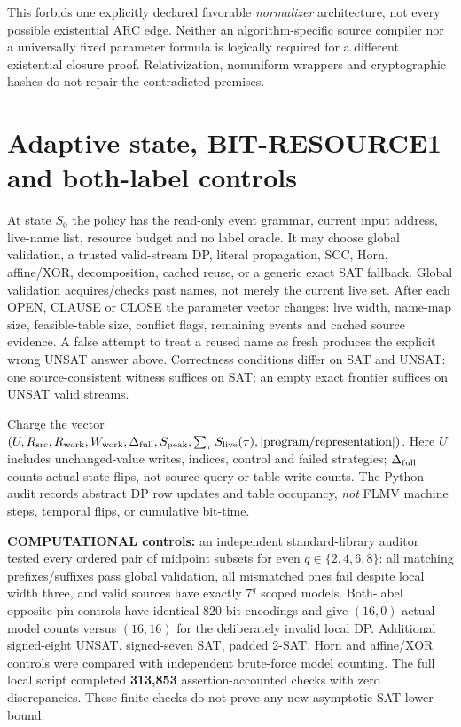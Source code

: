 \documentclass[11pt]{article}
\begin{document}
This forbids one explicitly declared favorable \emph{normalizer}
architecture, not every possible existential ARC edge. Neither an
algorithm-specific source compiler nor a universally fixed parameter
formula is logically required for a different existential closure
proof. Relativization, nonuniform wrappers and cryptographic hashes
do not repair the contradicted premises.

\section{Adaptive state, BIT-RESOURCE1 and both-label controls}
At state $S_0$ the policy has the read-only event grammar, current
input address, live-name list, resource budget and no label oracle.
It may choose global validation, a trusted valid-stream DP,
literal propagation, SCC, Horn, affine/XOR, decomposition,
cached reuse, or a generic exact SAT fallback. Global validation
acquires/checks past names, not merely the current live set.
After each OPEN, CLAUSE or CLOSE the parameter vector changes:
live width, name-map size, feasible-table size, conflict flags,
remaining events and cached source evidence. A false attempt to
treat a reused name as fresh produces the explicit wrong UNSAT
answer above. Correctness conditions differ on SAT and UNSAT:
one source-consistent witness suffices on SAT; an empty exact
frontier suffices on UNSAT valid streams.

Charge the vector
$(U,R_{\rm src},R_{\rm work},W_{\rm work},
\Delta_{\rm full},S_{\rm peak},\sum_\tau S_{\rm live}(\tau),
|\text{program/representation}|)$.
Here $U$ includes unchanged-value writes, indices, control and
failed strategies; $\Delta_{\rm full}$ counts actual state flips,
not source-query or table-write counts. The Python audit records
abstract DP row updates and table occupancy, \emph{not} FLMV
machine steps, temporal flips, or cumulative bit-time.

\textbf{COMPUTATIONAL controls:} an independent standard-library
auditor tested every ordered pair of midpoint subsets for even
$q\in\{2,4,6,8\}$: all matching prefixes/suffixes pass global
validation, all mismatched ones fail despite local width three,
and valid sources have exactly $7^q$ scoped models. Both-label
opposite-pin controls have identical 820-bit encodings and give
$(16,0)$ actual model counts versus $(16,16)$ for the deliberately
invalid local DP. Additional signed-eight UNSAT, signed-seven SAT,
padded 2-SAT, Horn and affine/XOR controls were compared with
independent brute-force model counting.
The full local script completed \textbf{313,853}
assertion-accounted checks with zero discrepancies. These finite
checks do not prove any new asymptotic SAT lower bound.
\end{document}
